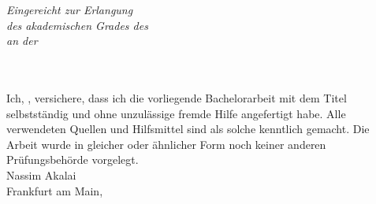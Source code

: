 \begin{titlepage}
\begin{center}
		
		\vfill
		
		\large \textit{Eingereicht zur Erlangung\\ des akademischen Grades des \degreename}\\[0.3cm] %
		\textit{an der}\\[0.4cm]
		\deptname\\\groupname\\[1cm] %
		
		\vfill
		
		{\large \submissiondate} %
		
		\vfill
	\end{center}
\end{titlepage}

\begin{declaration}
	\addchaptertocentry{\authorshipname}
	Ich, \mbox{\authorname}, versichere, dass ich die vorliegende Bachelorarbeit mit dem Titel
	\glqq\textbf{\ttitle}\grqq{} selbstst\"andig und ohne unzul\"assige fremde Hilfe angefertigt habe.
	Alle verwendeten Quellen und Hilfsmittel sind als solche kenntlich gemacht. Die Arbeit wurde
	in gleicher oder \"ahnlicher Form noch keiner anderen Pr\"ufungsbeh\"orde vorgelegt.\\[1cm]
	\noindent Nassim Akalai \\
	\noindent Frankfurt am Main, \submissiondate
\end{declaration}





